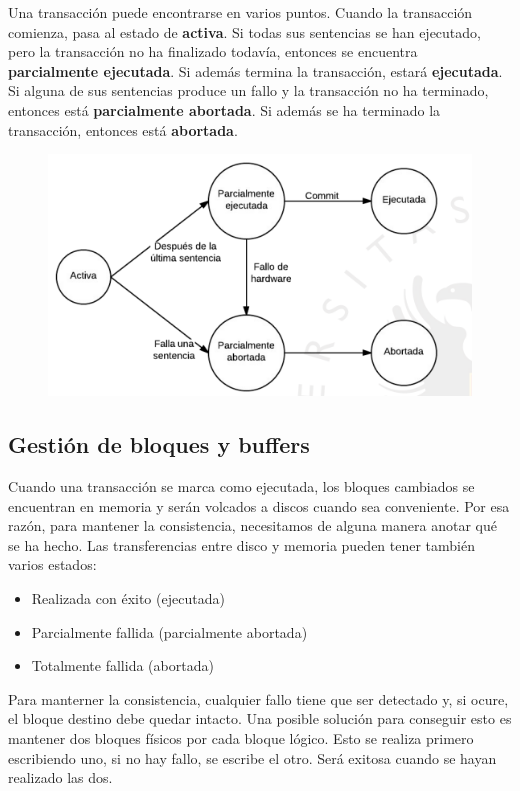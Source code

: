 Una transacción puede encontrarse en varios puntos. Cuando la transacción comienza, pasa al estado de \textbf{activa}. Si todas sus sentencias se han ejecutado, pero la transacción no ha finalizado todavía, entonces se encuentra \textbf{parcialmente ejecutada}. Si además termina la transacción, estará \textbf{ejecutada}. Si alguna de sus sentencias produce un fallo y la transacción no ha terminado, entonces está \textbf{parcialmente abortada}. Si además se ha terminado la transacción, entonces está \textbf{abortada}.

\begin{figure}[H]
  \center
  \includegraphics[scale=0.45]{img/18.png}
\end{figure}

\subsection{Gestión de bloques y buffers}

Cuando una transacción se marca como ejecutada, los bloques cambiados se encuentran en memoria y serán volcados a discos cuando sea conveniente. Por esa razón, para mantener la consistencia, necesitamos de alguna manera anotar qué se ha hecho. Las transferencias entre disco y memoria pueden tener también varios estados:

\begin{itemize}
\item Realizada con éxito (ejecutada)
\item Parcialmente fallida (parcialmente abortada)
\item Totalmente fallida (abortada)
\end{itemize}

Para manterner la consistencia, cualquier fallo tiene que ser detectado y, si ocure, el bloque destino debe quedar intacto. Una posible solución para conseguir esto es mantener dos bloques físicos por cada bloque lógico. Esto se realiza primero escribiendo uno, si no hay fallo, se escribe el otro. Será exitosa cuando se hayan realizado las dos. 

